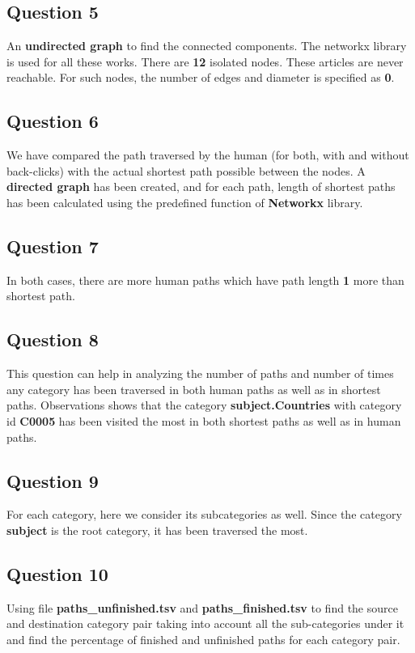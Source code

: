\documentclass[12pt,a4paper]{report}
\begin{document}
\begin{flushleft}
\newpage

\subsection*{Question 5}
An \textbf{undirected graph} to find the connected components. The networkx
library is used for all these works. There are \textbf{12} isolated nodes. These articles are never reachable. For such nodes, the number of edges and diameter is
specified as \textbf{0}.

\subsection*{Question 6}
We have compared the path traversed by the human (for both, with and without
back-clicks) with the actual shortest path possible between the nodes. A \textbf{directed graph} has been created, and for each path, length of shortest paths has been calculated using the predefined function of \textbf{Networkx} library.


\subsection*{Question 7}
In both cases, there are more human paths which have path length \textbf{1} more than shortest path.

\subsection*{Question 8}
This question can help in analyzing the number of paths and number of times
any category has been traversed in both human paths as well as in shortest
paths. Observations shows that the category \textbf{subject.Countries}
with category id \textbf{C0005} has been visited the most in both shortest paths as well as in human paths.

\subsection*{Question 9}
For each category, here we consider its subcategories as well. Since the category
\textbf{subject} is the root category, it has been traversed the most.

\subsection*{Question 10}
Using file \textbf{paths\_unfinished.tsv} and \textbf{paths\_finished.tsv} to find the source and destination category pair taking into account all the sub-categories under it and find the percentage of finished and unfinished paths for each category pair.


\end{flushleft}
\end{document}
